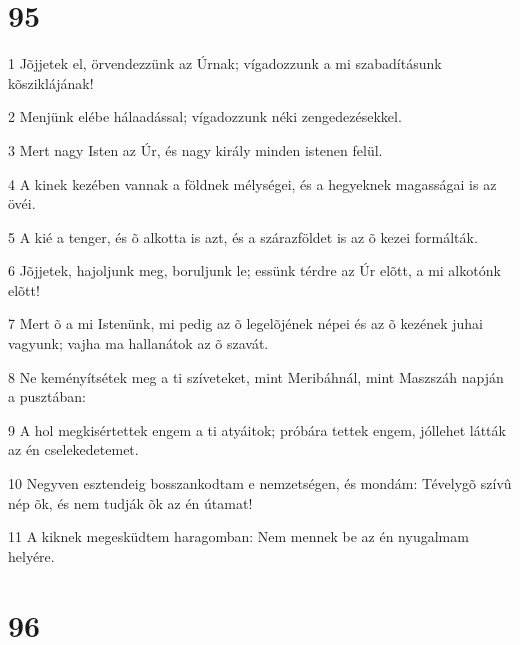 \chapter{95}

\par 1 Jõjjetek el, örvendezzünk az Úrnak; vígadozzunk a mi szabadításunk kõsziklájának!
\par 2 Menjünk elébe hálaadással; vígadozzunk néki zengedezésekkel.
\par 3 Mert nagy Isten az Úr, és nagy király minden istenen felül.
\par 4 A kinek kezében vannak a földnek mélységei, és a hegyeknek magasságai is az övéi.
\par 5 A kié a tenger, és õ alkotta is azt, és a szárazföldet is az õ kezei formálták.
\par 6 Jõjjetek, hajoljunk meg, boruljunk le; essünk térdre az Úr elõtt, a mi alkotónk elõtt!
\par 7 Mert õ a mi Istenünk, mi pedig az õ legelõjének népei és az õ kezének juhai vagyunk; vajha ma hallanátok az õ szavát.
\par 8 Ne keményítsétek meg a ti szíveteket, mint Meribáhnál, mint Maszszáh napján a pusztában:
\par 9 A hol megkisértettek engem a ti atyáitok; próbára tettek engem, jóllehet látták az én cselekedetemet.
\par 10 Negyven esztendeig bosszankodtam e nemzetségen, és mondám: Tévelygõ szívû nép õk, és nem tudják õk az én útamat!
\par 11 A kiknek megesküdtem haragomban: Nem mennek be az én nyugalmam helyére.

\chapter{96}

